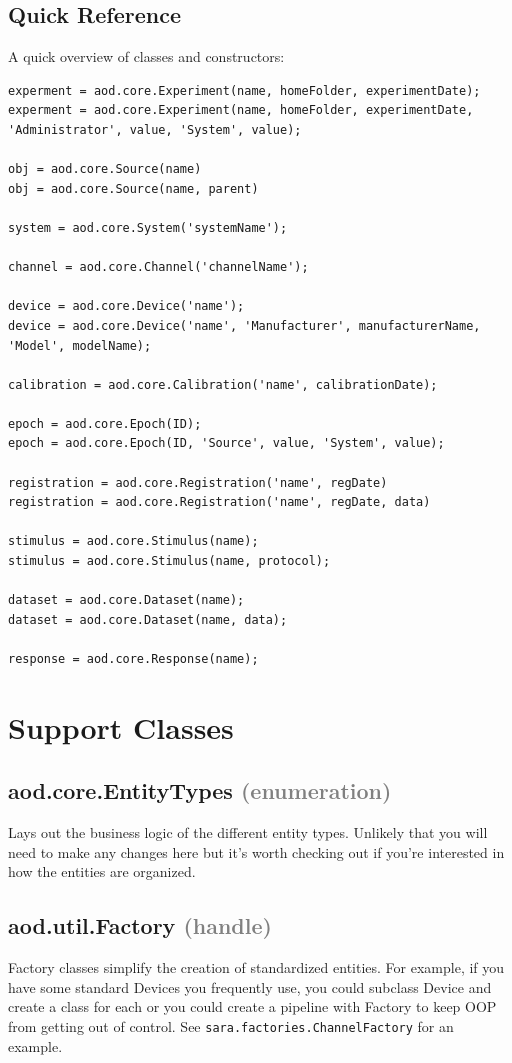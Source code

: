\documentclass[10pt]{exam}
\newcommand\myparent[1]{\textcolor{gray}{(#1)}}
\newcommand\aodclass[1]{\textcolor{codeblue}{\texttt{#1}}}
\begin{document}
	\subsection{Quick Reference}
		\noindent A quick overview of classes and constructors:
		\begin{lstlisting}[style=matlab-editor, basicstyle=\mlttfamily\footnotesize]
experment = aod.core.Experiment(name, homeFolder, experimentDate);
experment = aod.core.Experiment(name, homeFolder, experimentDate, 'Administrator', value, 'System', value);

obj = aod.core.Source(name)
obj = aod.core.Source(name, parent)

system = aod.core.System('systemName');

channel = aod.core.Channel('channelName');

device = aod.core.Device('name');
device = aod.core.Device('name', 'Manufacturer', manufacturerName, 'Model', modelName);

calibration = aod.core.Calibration('name', calibrationDate);

epoch = aod.core.Epoch(ID);
epoch = aod.core.Epoch(ID, 'Source', value, 'System', value);

registration = aod.core.Registration('name', regDate)
registration = aod.core.Registration('name', regDate, data)

stimulus = aod.core.Stimulus(name);
stimulus = aod.core.Stimulus(name, protocol);

dataset = aod.core.Dataset(name);
dataset = aod.core.Dataset(name, data);

response = aod.core.Response(name);
		\end{lstlisting}
	
\section{Support Classes}
	\subsection{aod.core.EntityTypes \myparent{enumeration}}
		\noindent Lays out the business logic of the different entity types. Unlikely that you will need to make any changes here but it's worth checking out if you're interested in how the entities are organized. 
		
	\subsection{aod.util.Factory \textcolor{gray}{(handle)}}
		\noindent Factory classes simplify the creation of standardized entities. For example, if you have some standard Devices you frequently use, you could subclass Device and create a class for each or you could create a pipeline with Factory to keep OOP from getting out of control. See \aodclass{sara.factories.ChannelFactory} for an example. 
		
\end{document}
